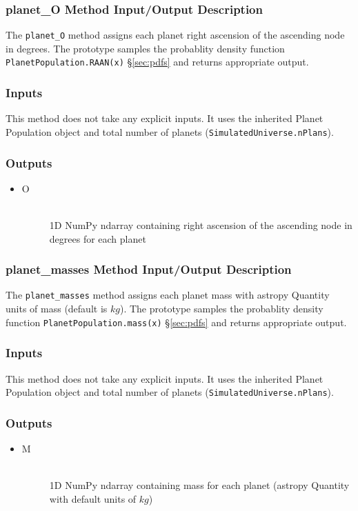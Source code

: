 \documentclass[cleanfoot]{asme2ej}
\begin{document}
\subsubsection{planet\_O Method Input/Output Description} \label{sec:planetOtask}
The \verb+planet_O+ method assigns each planet right ascension of the ascending node in degrees. The prototype samples the probablity density function \verb+PlanetPopulation.RAAN(x)+ \S\ref{sec:pdfs} and returns appropriate output.

\subsubsection*{Inputs}
This method does not take any explicit inputs.  It uses the inherited Planet Population object and total number of planets (\verb+SimulatedUniverse.nPlans+).

\subsubsection*{Outputs}
\begin{itemize}
    \item 
    \begin{description}
        \item[O] \hfill \\
        1D NumPy ndarray containing right ascension of the ascending node in degrees for each planet
    \end{description}
\end{itemize}

\subsubsection{planet\_masses Method Input/Output Description} \label{sec:planetmassestask}
The \verb+planet_masses+ method assigns each planet mass with astropy Quantity units of mass (default is $ kg $). The prototype samples the probablity density function \verb+PlanetPopulation.mass(x)+ \S\ref{sec:pdfs} and returns appropriate output.

\subsubsection*{Inputs}
This method does not take any explicit inputs.  It uses the inherited Planet Population object and total number of planets (\verb+SimulatedUniverse.nPlans+).

\subsubsection*{Outputs}
\begin{itemize}
    \item 
    \begin{description}
        \item[M] \hfill \\
        1D NumPy ndarray containing mass for each planet (astropy Quantity with default units of $ kg $)
    \end{description}
\end{itemize}
\end{document}
